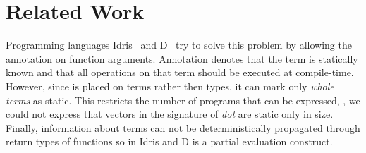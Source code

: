 \section{Related Work}
\label{sct:related-work}



 Programming languages Idris~\cite{brady2010scrapping} and D~\cite{dlang} try to solve this problem by allowing
  the  annotation on function arguments. Annotation  denotes
  that the term is statically known and that all operations on that term should
  be executed at compile-time. However, since  is placed on terms rather
  then types, it can mark only \emph{whole terms} as static. This restricts the number
  of programs that can be expressed, \eg, we could not express that vectors in the
  signature of \emph{dot} are static only in size. Finally, information about 
  terms can not be deterministically propagated through return types of functions so 
  in Idris and D is a partial evaluation construct.

